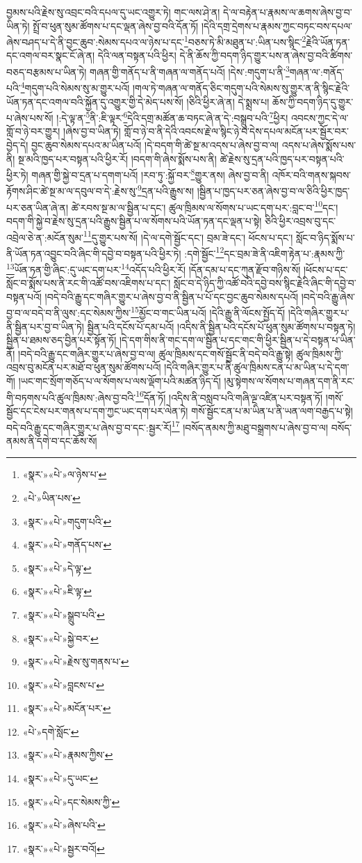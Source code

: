 བྱམས་པའི་རྗེས་སུ་འབྲང་བའི་དཔལ་དུ་ཡང་འགྱུར་ཏེ། གང་ལས་ཤེ་ན། དེ་ལ་བརྟེན་པ་རྣམས་ལ་ཆགས་ཞེས་བྱ་བ་ཡིན་ཏེ། སྤྲོ་བ་ཕུན་སུམ་ཚོགས་པ་དང་ལྡན་ཞེས་བྱ་བའི་དོན་ཏོ། །དེའི་དགྲ་དྲེགས་པ་རྣམས་ཀྱང་བཏང་བས་དཔལ་ཞེས་བཤད་པ་དེ་ནི་བྱང་ཆུབ་:སེམས་དཔའ་ལ་ཉེས་པ་དང་\footnote{«སྣར་»«པེ་»ལ་ཉེས་པ་}བཅས་ཏེ་མི་མཐུན་པ་:ཡིན་པས་སྙིང་\footnote{«པེ་»ཡིན་པས་}རྗེའི་ཡོན་ཏན་དང་འགལ་བར་སྣང་ངོ་ཞེ་ན། དེའི་ལན་བསྟན་པའི་ཕྱིར། དེ་ནི་ཆོས་ཀྱི་བདག་ཉིད་གྱུར་པས་ན་ཞེས་བྱ་བའི་ཚིགས་བཅད་བརྩམས་པ་ཡིན་ཏེ། གཞན་གྱི་གནོད་པ་ནི་གཞན་ལ་གནོད་པའོ། །དེས་:གདུག་པ་ནི་\footnote{«སྣར་»«པེ་»གདུག་པའི་}གཞན་ལ་:གནོད་པའི་\footnote{«སྣར་»«པེ་»གནོད་པས་}གདུག་པའི་སེམས་སུ་མ་གྱུར་པའོ། །གལ་ཏེ་གཞན་ལ་གནོད་ཅིང་གདུག་པའི་སེམས་སུ་གྱུར་ན་ནི་སྙིང་རྗེའི་ཡོན་ཏན་དང་འགལ་བའི་སྐྱོན་དུ་འགྱུར་གྱི་དེ་མེད་པས་སོ། །ཅིའི་ཕྱིར་ཞེ་ན། དེ་སྨྲས་པ། ཆོས་ཀྱི་བདག་ཉིད་དུ་གྱུར་པ་ཞེས་པས་སོ། །:དེ་ལྟ་ན་\footnote{«སྣར་»«པེ་»དེ་ལྟ་}ནི་:ཇི་ལྟར་\footnote{«སྣར་»«པེ་»ཇི་ལྟ་}དེའི་དགྲ་མཚོན་ཆ་བཏང་ཞེ་ན་དེ་:བསྒྲུབ་པའི་\footnote{«སྣར་»«པེ་»སྒྲུབ་པའི་}ཕྱིར། འབངས་ཀྱང་དེ་ལ་གློ་བ་ཉེ་བར་གྱུར། །ཞེས་བྱ་བ་ཡིན་ཏེ། གློ་བ་ཉེ་བ་ནི་དེའི་འབངས་རྗེ་ལ་སྙིང་ཉེ་བ་དེས་དཔལ་མངོན་པར་སྦྱོར་བར་བྱེད་དེ། བྱང་ཆུབ་སེམས་དཔའ་མ་ཡིན་པའོ། །དེ་བདག་གི་ཚེ་སྔ་མ་འདས་པ་ཞེས་བྱ་བ་ལ། འདས་པ་ཞེས་སྨོས་པས་ནི། སྔ་མའི་ཁྱད་པར་བསྟན་པའི་ཕྱིར་རོ། །བདག་གི་ཞེས་སྨོས་པས་ནི། ཚེ་རྗེས་སུ་དྲན་པའི་ཁྱད་པར་བསྟན་པའི་ཕྱིར་ཏེ། གཞན་གྱི་སྐྱེ་བ་དྲན་པ་དགག་པའོ། །རབ་ཏུ་:སྐྱོ་བར་\footnote{«སྣར་»«པེ་»སྐྱེ་བར་}གྱུར་ནས། ཞེས་བྱ་བ་ནི། འཁོར་བའི་གནས་སྐབས་རྟོགས་ཤིང་ཚེ་སྔ་མ་ལ་དབུལ་བ་དེ་:རྗེས་སུ་\footnote{«སྣར་»«པེ་»རྗེས་སུ་གནས་པ་}དྲན་པའི་རྒྱུས་ས། །སྦྱིན་པ་ཁྱད་པར་ཅན་ཞེས་བྱ་བ་ལ་ཅིའི་ཕྱིར་ཁྱད་པར་ཅན་ཡིན་ཞེ་ན། ཚེ་རབས་སྔ་མ་ལ་སྦྱིན་པ་དང་། ཚུལ་ཁྲིམས་ལ་སོགས་པ་ཡང་དག་པར་:བླང་བ་\footnote{«སྣར་»«པེ་»བླངས་པ་}དང་། བདག་གི་སྐྱེ་བ་རྗེས་སུ་དྲན་པའི་རྒྱུས་སྦྱིན་པ་ལ་སོགས་པའི་ཡོན་ཏན་དང་ལྡན་པ་སྟེ། ཅིའི་ཕྱིར་འབྲས་བུ་དང་འབྲེལ་ཅེ་ན་:མངོན་སུམ་\footnote{«སྣར་»«པེ་»མངོན་པར་}དུ་གྱུར་པས་སོ། །དེ་ལ་དགེ་སྦྱོང་དང་། བྲམ་ཟེ་དང་། ཕོངས་པ་དང་། སློང་བ་ཉིད་སྨོས་པ་ནི་ཡོན་ཏན་འབྱུང་བའི་ཞིང་གི་དབྱེ་བ་བསྟན་པའི་ཕྱིར་ཏེ། :དགེ་སྦྱོང་\footnote{«པེ་»དགེ་སློང་}དང་བྲམ་ཟེ་ནི་འཇིག་རྟེན་པ་:རྣམས་ཀྱི་\footnote{«སྣར་»«པེ་»རྣམས་ཀྱིས་}ཡོན་ཏན་གྱི་ཞིང་:དུ་ཡང་དག་པར་\footnote{«སྣར་»«པེ་»དུ་ཡང་}འདོད་པའི་ཕྱིར་རོ། །དོན་དམ་པ་དང་ཀུན་རྫོབ་གཉིས་སོ། །ཕོངས་པ་དང་སློང་བ་སྨོས་པས་ནི་རང་གི་འཚོ་བས་འཇིགས་པ་དང་། སློང་བ་དེ་ཉིད་ཀྱི་འཚོ་བའི་དབྱེ་བས་སྙིང་རྗེའི་ཞིང་གི་དབྱེ་བ་བསྟན་པའོ། །བདེ་བའི་རྒྱུ་དང་གཞིར་གྱུར་པ་ཞེས་བྱ་བ་ནི་སྦྱིན་པ་པོ་དང་བྱང་ཆུབ་སེམས་དཔའོ། །བདེ་བའི་རྒྱུ་ཞེས་བྱ་བ་ལ་བདེ་བ་ནི་ལུས་:དང་སེམས་ཀྱིས་\footnote{«སྣར་»«པེ་»དང་སེམས་ཀྱི་}མྱོང་བ་གང་ཡིན་པའོ། །དེའི་རྒྱུ་ནི་ལོངས་སྤྱོད་དོ། །དེའི་གཞིར་གྱུར་པ་ནི་སྦྱིན་པར་བྱ་བ་ཡིན་ཏེ། སྦྱིན་པའི་དངོས་པོ་དམ་པའོ། །འདིས་ནི་སྦྱིན་པའི་དངོས་པོ་ཕུན་སུམ་ཚོགས་པ་བསྟན་ཏེ། སྦྱིན་པ་ཐམས་ཅད་བྱིན་པར་སྟོན་ཏོ། །དེ་དག་གིས་ནི་གང་དག་ལ་སྦྱིན་པ་དང་གང་གི་ཕྱིར་སྦྱིན་པ་དེ་བསྟན་པ་ཡིན་ནོ། །བདེ་བའི་རྒྱུ་དང་གཞིར་གྱུར་པ་ཞེས་བྱ་བ་ལ། ཚུལ་ཁྲིམས་དང་གསོ་སྦྱོང་ནི་བདེ་བའི་རྒྱུ་སྟེ། ཚུལ་ཁྲིམས་ཀྱི་འབྲས་བུ་མངོན་པར་མཐོ་བ་ཕུན་སུམ་ཚོགས་པའོ། །དེའི་གཞིར་གྱུར་པ་ནི་ཚུལ་ཁྲིམས་ངན་པ་མ་ཡིན་པ་དེ་དག་གོ། །ཡང་གང་སྲོག་གཅོད་པ་ལ་སོགས་པ་ལས་ལྡོག་པའི་མཚན་ཉིད་དོ། །མུ་སྟེགས་ལ་སོགས་པ་གཞན་དག་ནི་རང་གི་བཏགས་པའི་ཚུལ་ཁྲིམས་:ཞེས་བྱ་བའི་\footnote{«སྣར་»«པེ་»ཞེས་པའི་}དོན་ཏོ། །འདིས་ནི་བསླབ་པའི་གཞི་ལྔ་འཛིན་པར་བསྟན་ཏོ། །གསོ་སྦྱོང་དང་ངེས་པར་གནས་པ་དག་ཀྱང་ཡང་དག་པར་ལེན་ཏེ། གསོ་སྦྱོང་ངན་པ་མ་ཡིན་པ་ནི་ཡན་ལག་བརྒྱད་པ་སྟེ། བདེ་བའི་རྒྱུ་དང་གཞིར་གྱུར་པ་ཞེས་བྱ་བ་དང་:སྦྱར་རོ།\footnote{«སྣར་»«པེ་»སྦྱར་བའོ།} །བསོད་ནམས་ཀྱི་མཐུ་བསྒྲགས་པ་ཞེས་བྱ་བ་ལ། བསོད་ནམས་ནི་དགེ་བ་དང་ཆོས་སོ། 